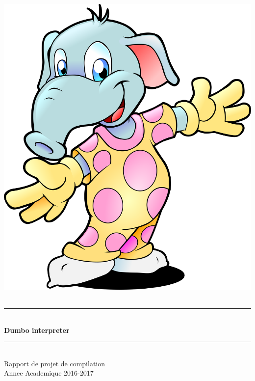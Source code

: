 \documentclass[10pt,a4paper]{article}
\newcommand{\HRule}{\rule{\linewidth}{0.5mm}}
\begin{document}
	
	\pagestyle{fancy}
	\fancyhf{}
	\cfoot{\thepage}
	
	\begin{titlepage}
		\begin{sffamily}
			\begin{center}
				\includegraphics[scale=0.25]{images/elephant.png}~\\[1.5cm]
				
				\HRule \\[0.5cm]
				{ \huge \bfseries Dumbo interpreter\\[0.4cm] }
				\HRule \\[1.5cm]
				
				\Large{Rapport de projet de compilation}\\[2cm]
				
				\Large{Annee Academique 2016-2017}\\[2cm]
				

\end{center}
\end{sffamily}
\end{titlepage}
\end{document}
